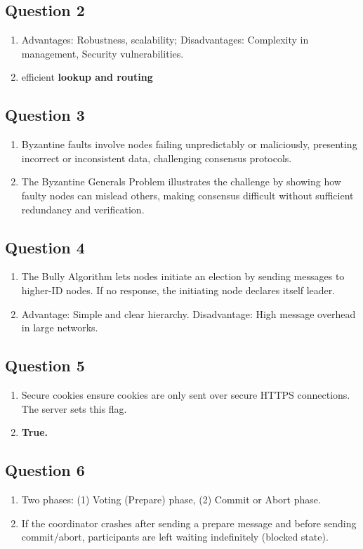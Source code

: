 \documentclass[12pt]{article}
\begin{document}
\subsection*{Question 2}
\begin{enumerate}[label=(\alph*)]
    \item Advantages: Robustness, scalability; Disadvantages: Complexity in management, Security vulnerabilities.
    \item efficient \textbf{lookup and routing}
\end{enumerate}

\subsection*{Question 3}
\begin{enumerate}[label=(\alph*)]
    \item Byzantine faults involve nodes failing unpredictably or maliciously, presenting incorrect or inconsistent data, challenging consensus protocols.
    \item The Byzantine Generals Problem illustrates the challenge by showing how faulty nodes can mislead others, making consensus difficult without sufficient redundancy and verification.
\end{enumerate}

\subsection*{Question 4}
\begin{enumerate}[label=(\alph*)]
    \item The Bully Algorithm lets nodes initiate an election by sending messages to higher-ID nodes. If no response, the initiating node declares itself leader.
    \item Advantage: Simple and clear hierarchy. Disadvantage: High message overhead in large networks.
\end{enumerate}

\subsection*{Question 5}
\begin{enumerate}[label=(\alph*)]
    \item Secure cookies ensure cookies are only sent over secure HTTPS connections. The server sets this flag.
    \item \textbf{True.}
\end{enumerate}

\subsection*{Question 6}
\begin{enumerate}[label=(\alph*)]
    \item Two phases: (1) Voting (Prepare) phase, (2) Commit or Abort phase.
    \item If the coordinator crashes after sending a prepare message and before sending commit/abort, participants are left waiting indefinitely (blocked state).
\end{enumerate}
\end{document}
